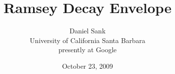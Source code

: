 \documentclass{article}
\begin{document}
\title{Ramsey Decay Envelope}
\author{Daniel Sank\\University of California Santa Barbara\\presently at Google}
\date{October 23, 2009}

\maketitle





\end{document}

